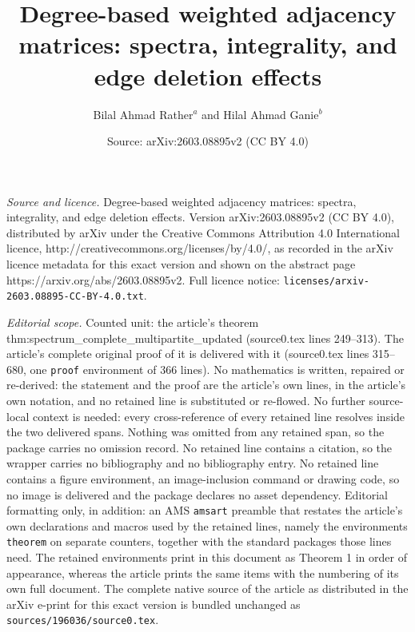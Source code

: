 \documentclass[10pt,a4paper]{amsart}
\title{Degree-based weighted adjacency matrices: spectra, integrality, and edge deletion effects}
\author{{\small Bilal Ahmad Rather$^{a}$ and Hilal Ahmad Ganie$^{b}$}}
\date{Source: arXiv:2603.08895v2 (CC BY 4.0)}
\begin{document}
\maketitle

\noindent\emph{Source and licence.} Degree-based weighted adjacency matrices: spectra, integrality, and edge deletion effects. Version arXiv:2603.08895v2 (CC BY 4.0), distributed by arXiv under the Creative Commons Attribution 4.0 International licence, http://creativecommons.org/licenses/by/4.0/, as recorded in the arXiv licence metadata for this exact version and shown on the abstract page https://arxiv.org/abs/2603.08895v2. Full licence notice: \texttt{licenses/arxiv-2603.08895-CC-BY-4.0.txt}.\par\smallskip

\noindent\textit{Editorial scope.} Counted unit: the article's theorem thm:spectrum\_complete\_multipartite\_updated (source0.tex lines 249--313). The article's complete original proof of it is delivered with it (source0.tex lines 315--680, one \texttt{proof} environment of 366 lines). No mathematics is written, repaired or re-derived: the statement and the proof are the article's own lines, in the article's own notation, and no retained line is substituted or re-flowed.  No further source-local context is needed: every cross-reference of every retained line resolves inside the two delivered spans.  Nothing was omitted from any retained span, so the package carries no omission record.  No retained line contains a citation, so the wrapper carries no bibliography and no bibliography entry.  No retained line contains a figure environment, an image-inclusion command or drawing code, so no image is delivered and the package declares no asset dependency.  Editorial formatting only, in addition: an AMS \texttt{amsart} preamble that restates the article's own declarations and macros used by the retained lines, namely the environments \texttt{theorem} on separate counters, together with the standard packages those lines need.  The retained environments print in this document as Theorem 1 in order of appearance, whereas the article prints the same items with the numbering of its own full document.  The complete native source of the article as distributed in the arXiv e-print for this exact version is bundled unchanged as \texttt{sources/196036/source0.tex}.
\end{document}
